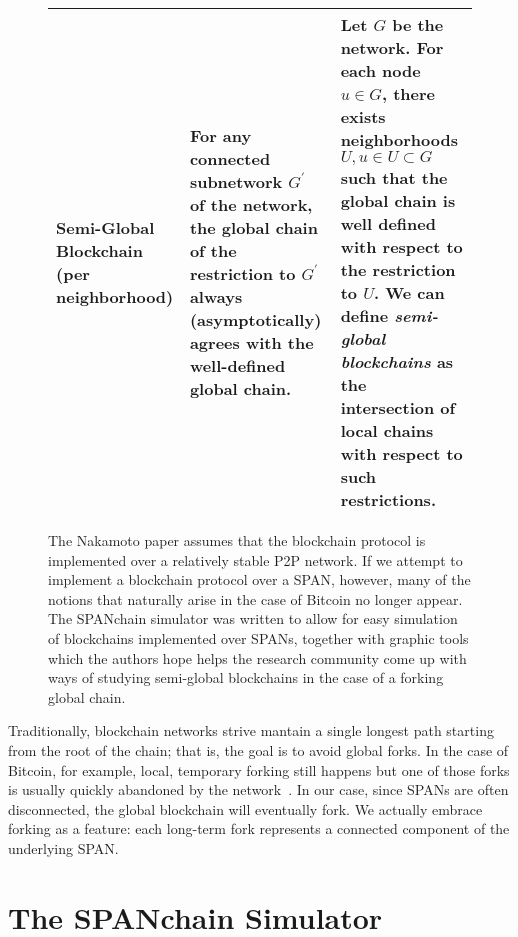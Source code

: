 \begin{figure*}[t]
\begin{tabular}{|p{3cm}||p{6.7cm}|p{6.7cm}|}
		\raggedright
		\textbf{Semi-Global Blockchain (per neighborhood)} &
			For any connected subnetwork $G^\prime$ of the network, the
			global chain of the restriction to $G^\prime$ always
			(asymptotically) agrees with the well-defined global
			chain.
			&
			Let $G$ be the network. For each node $u\in G$, there exists
			neighborhoods $U,u\in U\subset G$ such that the global
			chain is well defined with respect to the restriction
			to $U$. We can define \textit{semi-global blockchains}
			as the intersection of local chains with respect to
			such restrictions.
			\\
		\hline
	\end{tabular}
	\caption{The Nakamoto paper assumes that the blockchain protocol is
		implemented over a relatively stable P2P network. If we attempt to
		implement a blockchain protocol over a SPAN, however, many of the
		notions that naturally arise in the case of Bitcoin no longer appear.
		The SPANchain simulator was written to allow for easy simulation of 
		blockchains implemented over SPANs, together with graphic tools which
		the authors hope helps the research community come up with ways
		of studying semi-global blockchains in the case of a forking global chain.}
	\label{tab:three_table}
\end{figure*}

Traditionally,
blockchain networks strive mantain a single longest path
starting from the root of the chain;
that is,
the goal is to avoid global forks.
In the case of Bitcoin,
for example,
local, temporary forking still happens
but one of those forks is usually quickly abandoned by the network~\cite{decker_2013}.
In our case,
since SPANs are often disconnected,
the global blockchain will eventually fork.
We actually embrace forking as a feature:
each long-term fork represents a connected component of the underlying SPAN.

\section{The SPANchain Simulator}
\label{sec:SPANchain}

